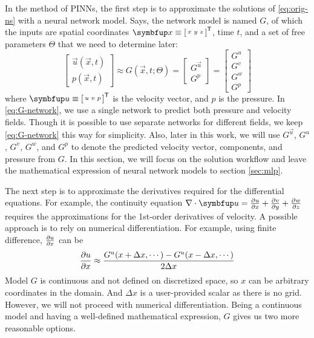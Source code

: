 In the method of PINNs, the first step is to approximate the solutions of \eqref{eq:orig-ns} with a neural network model.
Says, the network model is named $G$, of which the inputs are spatial coordinates $\vec{x}\equiv\begin{bsmallmatrix}x & y & z\end{bsmallmatrix}^\mathsf{T}$, time $t$, and a set of free parameters $\Theta$ that we need to determine later:
\begin{equation}\label{eq:G-network}
    \begin{bmatrix}
        \vec{u}(\vec{x}, t) \\ p(\vec{x}, t)
    \end{bmatrix}
    \approx
    G(\vec{x}, t; \Theta)
    =
    \begin{bmatrix}
        G^{\vec{u}} \\
        G^p
    \end{bmatrix}
    =
    \begin{bmatrix}
        G^u \\
        G^v \\
        G^w \\
        G^p
    \end{bmatrix}
\end{equation}
where $\vec{u}\equiv\begin{bsmallmatrix}u & v & p\end{bsmallmatrix}^\mathsf{T}$ is the velocity vector, and $p$ is the pressure.
In \eqref{eq:G-network}, we use a single network to predict both pressure and velocity fields.
Though it is possible to use separate networks for different fields, we keep \eqref{eq:G-network} this way for simplicity.
Also, later in this work, we will use $G^{\vec{u}}$, $G^u$, $G^v$, $G^w$, and $G^p$ to denote the predicted velocity vector, components, and pressure from $G$.
In this section, we will focus on the solution workflow \cite{dissanayake_neural-network-based_1994,lagaris_artificial_1998,cai_physics-informed_2021} and leave the mathematical expression of neural network models to section \ref{sec:mlp}.

The next step is to approximate the derivatives required for the differential equations.
For example, the continuity equation $\nabla \cdot \vec{u} = \pdiff{u}{x} + \pdiff{v}{y} + \pdiff{w}{z}$ requires the approximations for the 1st-order derivatives of velocity.
A possible approach is to rely on numerical differentiation.
For example, using finite difference, $\frac{\partial u}{\partial x}$ can be
\begin{equation*}
    \frac{\partial u}{\partial x} \approx \frac{G^u(x+\Delta x, \cdots)-G^u(x-\Delta x, \cdots)}{2\Delta x} 
\end{equation*}
Model $G$ is continuous and not defined on discretized space, so $x$ can be arbitrary coordinates in the domain.
And $\Delta x$ is a user-provided scalar as there is no grid.
However, we will not proceed with numerical differentiation. 
Being a continuous model and having a well-defined mathematical expression, $G$ gives us two more reasonable options.

